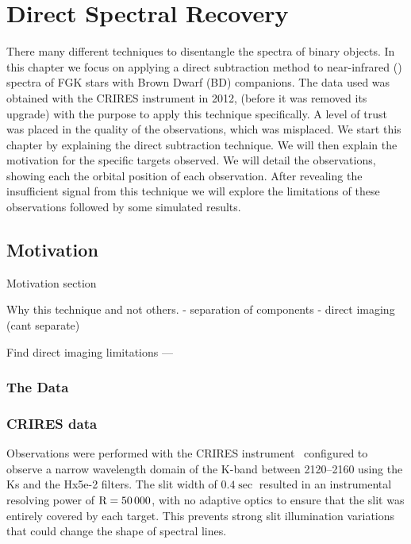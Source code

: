 

\chapter{Direct Spectral Recovery}  %
\label{cha:direct_recovery}
There many different techniques to disentangle the spectra of binary objects. In this chapter we focus on applying a direct subtraction method to near-infrared (\nir{}) spectra of FGK stars with Brown Dwarf (BD) companions. The data used was obtained with the CRIRES instrument in 2012, (before it was removed its upgrade) with the purpose to apply this technique specifically. A level of trust was placed in the quality of the observations, which was misplaced. 
We start this chapter by explaining the direct subtraction technique. We will then explain the motivation for the specific targets observed. We will detail the observations, showing each the orbital position of each observation. After revealing the insufficient signal from this technique we will explore the limitations of these observations followed by some simulated results.

\section{Motivation}


Motivation section

Why this technique and not others.
- separation of components
- direct imaging (cant separate)


Find direct imaging limitations ---


\subsection{The Data}

\subsection{CRIRES data}
\label{subsec:CRIRES}
Observations were performed with the CRIRES instrument~\citep{kaeufl_crires_2004} configured to observe a narrow wavelength domain of the K-band between 2120--2160\nm{} using the Ks and the Hx5e-2 filters. The slit width of \(0.4\sec\) resulted in an instrumental resolving power of \(\rm R=50\,000\), with no adaptive optics to ensure that the slit was entirely covered by each target. This prevents strong slit illumination variations that could change the shape of spectral lines.

